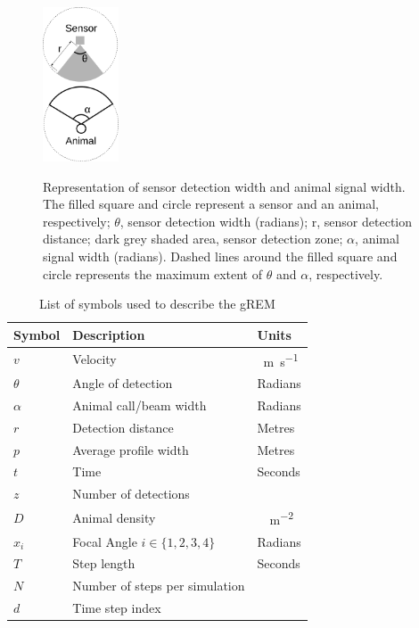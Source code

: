 \documentclass[a4paper,10pt,reqno,oneside]{amsart}
\begin{document}
\begin{figure}[t]
        \centering
	\includegraphics[width=0.2\textwidth]{imgs/angleDefinitions.pdf}
\label{f:AngleDef}
\caption{Representation of sensor detection width and animal signal width. The filled square and circle represent a sensor and an animal, respectively; $\theta$, sensor detection width (radians); r, sensor detection distance; dark grey shaded area, sensor detection zone; $\alpha$, animal signal width (radians). Dashed lines around the filled square and circle represents the maximum extent of $\theta$ and $\alpha$, respectively.} %

\end{figure}



\begin{table}[t]
\centering
\begin{tabular}{lll}
Symbol 	& Description & Units\\\hline
$v$		& Velocity & \SI{}{\meter\per\second}\\
$\theta$	& Angle of detection & Radians \\
$\alpha$	& Animal call/beam width & Radians \\
$r$ 		& Detection distance & Metres\\
$p$ 		& Average profile width & Metres\\
$t$		& Time & Seconds\\
$z$		& Number of detections & \\
$D$		& Animal density & \SI{}{\animals\per\meter\squared} \\
$x_i$	        & Focal Angle $i \in \{1,2,3,4\} $ 	& Radians\\
$T$ 		& Step length & Seconds\\
$N$ 		& Number of steps per simulation & \\
$d$ 		& Time step index &

\end{tabular}
\caption{List of symbols used to describe the gREM}
\label{t:paras}
\end{table}
\end{document}
